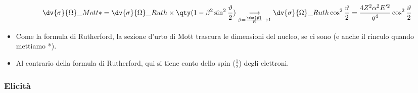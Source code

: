 \begin{itemize}
    \begin{equation*}
    \dv{\sigma}{\Omega}\_{Mott*}=\dv{\sigma}{\Omega}\_{Ruth}\times\qty(1-\beta^2\sin^2\frac\vartheta2)\underset{\beta=\frac{\abs {\vec p}}{E}\to1}{\longrightarrow}\dv{\sigma}{\Omega}\_{Ruth}\cos^2\frac\vartheta2=\frac{4Z^2\alpha^2E'^2}{q^4}\cos^2\frac\vartheta2
    \end{equation*}
    \item Come la formula di Rutherford, la sezione d'urto di Mott trascura le dimensioni del nucleo, se ci sono (e anche il rinculo quando mettiamo *).
    \item Al contrario della formula di Rutherford, qui si tiene conto dello spin ($\frac12$) degli elettroni.
\end{itemize}
\subsubsection{Elicità}
